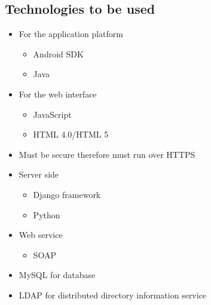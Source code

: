 \documentclass[11pt,a4paper]{article}
\begin{document}
\subsection{Technologies to be used}
\begin{itemize}
\item For the application platform
\begin{itemize}
\item Android SDK
\item Java
\end{itemize}
\item For the web interface
\begin{itemize}
\item JavaScript
\item HTML 4.0/HTML 5
\end{itemize}
\item Must be secure therefore must run over HTTPS
\item Server side
\begin{itemize}
\item Django framework
\item Python
\end{itemize}
\item Web service
\begin{itemize}
\item SOAP
\end{itemize}
\item MySQL for database
\item LDAP for distributed directory information service
\end{itemize}
\end{document}
